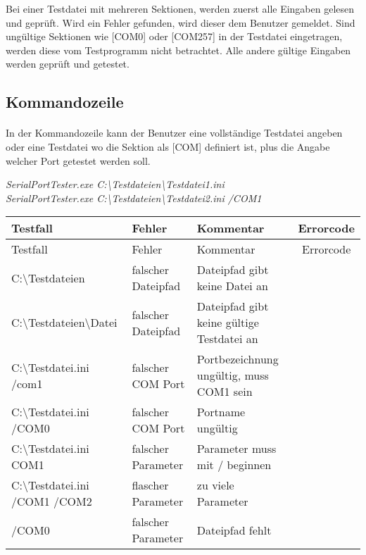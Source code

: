 Bei einer Testdatei mit mehreren Sektionen, werden zuerst alle Eingaben gelesen und geprüft. Wird ein Fehler gefunden, wird dieser dem Benutzer gemeldet. Sind ungültige Sektionen wie [COM0] oder [COM257] in der Testdatei eingetragen, werden diese vom Testprogramm nicht betrachtet. Alle andere gültige Eingaben werden geprüft und getestet.


\subsection{Kommandozeile}
\paragraph{}
In der Kommandozeile kann der Benutzer eine vollständige Testdatei angeben oder eine Testdatei wo die Sektion als [COM] definiert ist, plus die Angabe welcher Port getestet werden soll.

\hspace*{10mm}\textit{SerialPortTester.exe C:\textbackslash Testdateien\textbackslash Testdatei1.ini}\\
\hspace*{10mm}\textit{SerialPortTester.exe C:\textbackslash Testdateien\textbackslash Testdatei2.ini /COM1}\\

\begin{longtable}{||l|p{3cm}|p{5cm}|c||}
\hline
Testfall & Fehler & Kommentar & Errorcode \\ \hline\hline
\endfirsthead
\hline
Testfall & Fehler & Kommentar & Errorcode \\ \hline\hline
\endhead

C:\textbackslash Testdateien & falscher Dateipfad & Dateipfad gibt keine Datei an & \\ \hline
C:\textbackslash Testdateien\textbackslash Datei & falscher Dateipfad & Dateipfad gibt keine gültige Testdatei an & \\ \hline

C:\textbackslash Testdatei.ini /com1 & falscher COM Port & Portbezeichnung ungültig, muss COM1 sein & \\ \hline
C:\textbackslash Testdatei.ini /COM0 & falscher COM Port & Portname ungültig & \\ \hline
C:\textbackslash Testdatei.ini COM1 & falscher Parameter & Parameter muss mit / beginnen & \\ \hline

C:\textbackslash Testdatei.ini /COM1 /COM2& flascher Parameter & zu viele Parameter & \\ \hline
/COM0 & falscher Parameter & Dateipfad fehlt & \\ \hline

\end{longtable}


